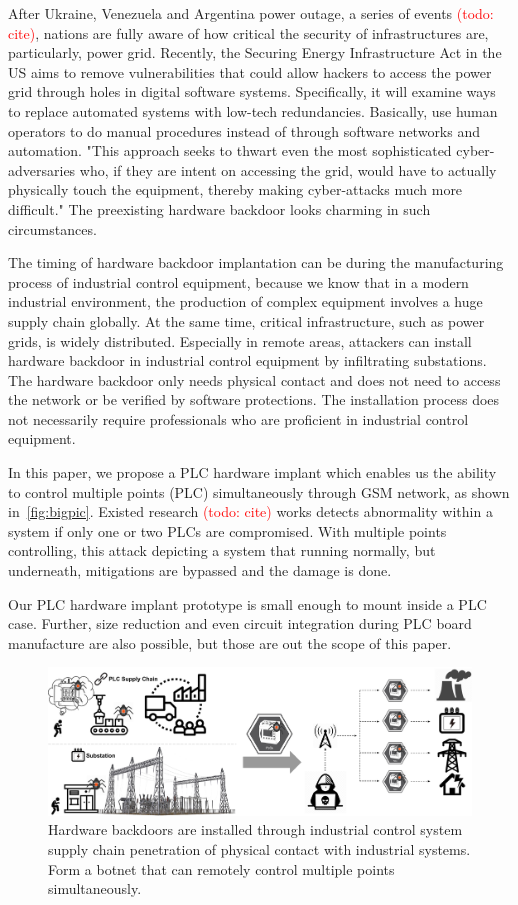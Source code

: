 After Ukraine, Venezuela and Argentina power outage, a series of events \textcolor{red}{(todo: cite)}, nations are fully aware of how critical the security of infrastructures are, particularly, power grid. Recently, the Securing Energy Infrastructure Act in the US aims to remove vulnerabilities that could allow hackers to access the power grid through holes in digital software systems. Specifically, it will examine ways to replace automated systems with low-tech redundancies. Basically, use human operators to do manual procedures instead of through software networks and automation. "This approach seeks to thwart even the most sophisticated cyber-adversaries who, if they are intent on accessing the grid, would have to actually physically touch the equipment, thereby making cyber-attacks much more difficult." The preexisting hardware backdoor looks charming in such circumstances.

The timing of hardware backdoor implantation can be during the manufacturing process of industrial control equipment, because we know that in a modern industrial environment, the production of complex equipment involves a huge supply chain globally. At the same time, critical infrastructure, such as power grids, is widely distributed. Especially in remote areas, attackers can install hardware backdoor in industrial control equipment by infiltrating substations. The hardware backdoor only needs physical contact and does not need to access the network or be verified by software protections. The installation process does not necessarily require professionals who are proficient in industrial control equipment.

In this paper, we propose a PLC hardware implant which enables us the ability to control multiple points (PLC) simultaneously through GSM network, as shown in~\autoref{fig:bigpic}. Existed research \textcolor{red}{(todo: cite)} works detects abnormality within a system if only one or two PLCs are compromised. With multiple points controlling, this attack depicting a system that running normally, but underneath, mitigations are bypassed and the damage is done.

Our PLC hardware implant prototype is small enough to mount inside a PLC case. Further, size reduction and even circuit integration during PLC board manufacture are also possible, but those are out the scope of this paper.

\begin{figure}[tp]
	\includegraphics[width=\textwidth]{figures/bigpic}
	\centering
	\caption{Hardware backdoors are installed through industrial control system supply chain penetration of physical contact with industrial systems. Form a botnet that can remotely control multiple points simultaneously.}
	\label{fig:bigpic}
\end{figure}

